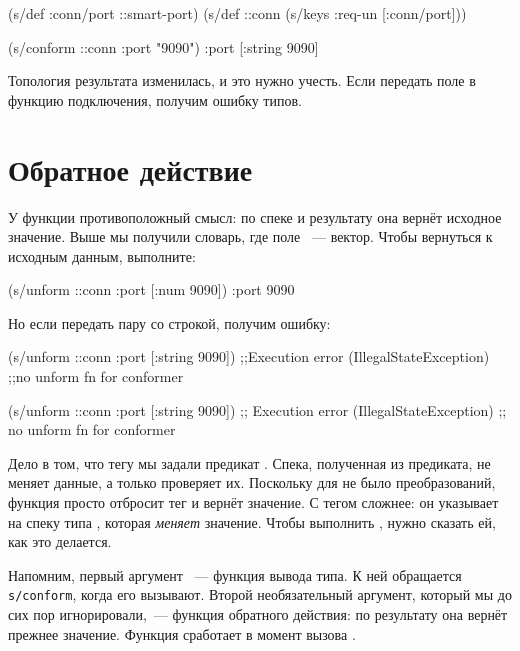 \begin{clojure}
(s/def :conn/port ::smart-port)
(s/def ::conn
  (s/keys :req-un [:conn/port]))

(s/conform ::conn {:port "9090"})
{:port [:string 9090]}
\end{clojure}


\fi

Топология результата изменилась, и это нужно учесть. Если передать поле
 в функцию подключения, получим ошибку типов.

\section{Обратное действие}


У функции  противоположный смысл: по спеке и результату она
вернёт исходное значение. Выше мы получили словарь, где поле ~---
вектор. Чтобы вернуться к исходным данным, выполните:


\begin{clojure}
(s/unform ::conn {:port [:num 9090]})
{:port 9090}
\end{clojure}


\noindent
Но если передать пару со строкой, получим ошибку:

\ifnarrow


\begin{clojure}
(s/unform ::conn {:port [:string 9090]})
;;Execution error (IllegalStateException)
;;no unform fn for conformer
\end{clojure}


\else


\begin{clojure}
(s/unform ::conn {:port [:string 9090]})
;; Execution error (IllegalStateException)
;; no unform fn for conformer
\end{clojure}


\fi

Дело в том, что тегу  мы задали предикат . Спека,
полученная из предиката, не меняет данные, а только проверяет их. Поскольку для
 не было преобразований, функция  просто отбросит тег
и вернёт значение. С тегом  сложнее: он указывает на спеку типа
, которая \emph{меняет} значение. Чтобы выполнить ,
нужно сказать ей, как это делается.


Напомним, первый аргумент ~--- функция вывода типа. К ней
обращается \texttt{s/con\-form}, когда его вызывают. Второй необязательный
аргумент, который мы до сих пор игнорировали,~--- функция обратного действия: по
результату  она вернёт прежнее значение. Функция сработает в
момент вызова .

